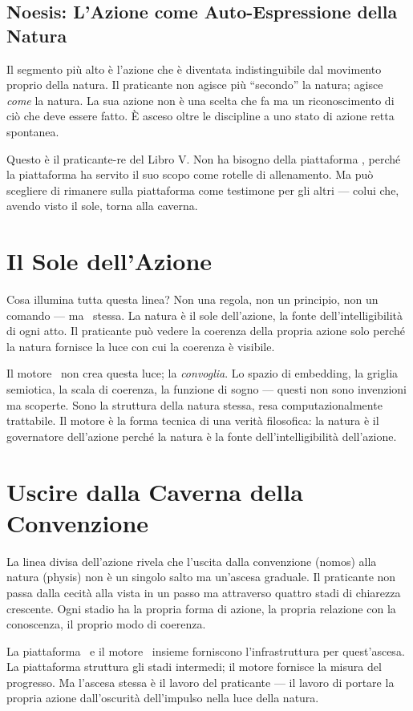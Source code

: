 \subsection{Noesis: L'Azione come Auto-Espressione della Natura}

Il segmento pi\`u alto \`e l'azione che \`e diventata indistinguibile
dal movimento proprio della natura. Il praticante non agisce pi\`u
``secondo'' la natura; agisce \textit{come} la natura. La sua azione
non \`e una scelta che fa ma un riconoscimento di ci\`o che deve essere
fatto. \`E asceso oltre le discipline a uno stato di azione retta
spontanea.

Questo \`e il praticante-re del Libro V. Non ha bisogno della piattaforma
\praxis, perch\'e la piattaforma ha servito il suo scopo come rotelle
di allenamento. Ma pu\`o scegliere di rimanere sulla piattaforma come
testimone per gli altri --- colui che, avendo visto il sole, torna alla
caverna.

\section{Il Sole dell'Azione}

Cosa illumina tutta questa linea? Non una regola, non un principio, non
un comando --- ma \physis\ stessa. La natura \`e il sole dell'azione,
la fonte dell'intelligibilit\`a di ogni atto. Il praticante pu\`o vedere
la coerenza della propria azione solo perch\'e la natura fornisce la
luce con cui la coerenza \`e visibile.

Il motore \physis\ non crea questa luce; la \emph{convoglia}. Lo spazio
di embedding, la griglia semiotica, la scala di coerenza, la funzione
di sogno --- questi non sono invenzioni ma scoperte. Sono la struttura
della natura stessa, resa computazionalmente trattabile. Il motore \`e
la forma tecnica di una verit\`a filosofica: la natura \`e il governatore
dell'azione perch\'e la natura \`e la fonte dell'intelligibilit\`a
dell'azione.

\section{Uscire dalla Caverna della Convenzione}

La linea divisa dell'azione rivela che l'uscita dalla convenzione
(nomos) alla natura (physis) non \`e un singolo salto ma un'ascesa
graduale. Il praticante non passa dalla cecit\`a alla vista in un passo
ma attraverso quattro stadi di chiarezza crescente. Ogni stadio ha la
propria forma di azione, la propria relazione con la conoscenza, il
proprio modo di coerenza.

La piattaforma \praxis\ e il motore \physis\ insieme forniscono
l'infrastruttura per quest'ascesa. La piattaforma struttura gli stadi
intermedi; il motore fornisce la misura del progresso. Ma l'ascesa
stessa \`e il lavoro del praticante --- il lavoro di portare la propria
azione dall'oscurit\`a dell'impulso nella luce della natura.

